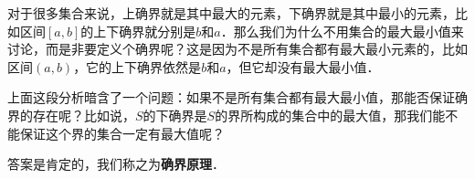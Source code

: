 对于很多集合来说，上确界就是其中最大的元素，下确界就是其中最小的元素，比如区间$[a, b]$的上下确界就分别是$b$和$a$．那么我们为什么不用集合的最大最小值来讨论，而是非要定义个确界呢？这是因为不是所有集合都有最大最小元素的，比如区间$(a, b)$，它的上下确界依然是$b$和$a$，但它却没有最大最小值．

上面这段分析暗含了一个问题：如果不是所有集合都有最大最小值，那能否保证确界的存在呢？比如说，$S$的下确界是$S$的界所构成的集合中的最大值，那我们能不能保证这个界的集合一定有最大值呢？

答案是肯定的，我们称之为\textbf{确界原理}．























